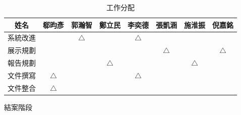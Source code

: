 \documentclass[12pt]{article}
\newcommand{\ci}{$\bigtriangleup$}
\begin{document}
\begin{center}
\begin{table}[!h]
\begin{subtable}{\textwidth}
\label{charge2}
\end{subtable}
\begin{subtable}{\textwidth}
\begin{tabular}{ | c | c | c | c | c | c | c | c | } \hline
姓名 & 郗昀彥 & 郭瀚智 & 鄭立民 & 李奕德 & 張凱涵 & 施淮振 & 倪嘉銘 \\ \hline \hline
系統改進 & & \ci & & \ci & & & \\ \hline
展示規劃 & & & & & \ci & & \ci \\ \hline
報告規劃 & & & \ci & & & \ci & \\ \hline
文件撰寫 & \ci & & & \ci & & & \\ \hline
文件整合 & \ci & & & & & & \\ \hline
\end{tabular}
\caption{結案階段}
\label{charge3}
\end{subtable}
\caption{工作分配}
\label{charge}
\end{table}
\end{center}
\end{document}

